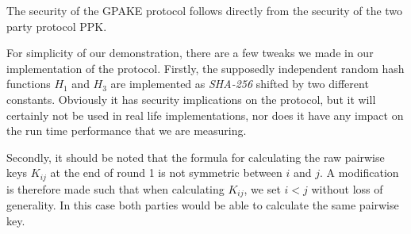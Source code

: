 The security of the GPAKE protocol follows directly from the security of the two party protocol PPK.

For simplicity of our demonstration, there are a few tweaks we made in our implementation of the
protocol. Firstly, the supposedly independent random hash functions $H_1$ and $H_3$ are implemented
as \textit{SHA-256} shifted by two different constants. Obviously it has security implications on the
protocol, but it will certainly not be used in real life implementations, nor does it have any impact on the
run time performance that we are measuring.

Secondly, it should be noted that the formula for calculating the raw pairwise keys $K_{ij}$ at the end of
round 1 is not symmetric between $i$ and $j$. A modification is therefore made such that when
calculating $K_{ij}$, we set $i < j$ without loss of generality. In this case both parties would be able to
calculate the same pairwise key.














